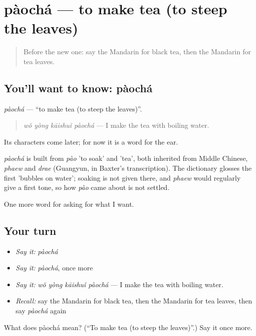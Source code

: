 \section[pàochá]{pàochá — to make tea (to steep the leaves)}

\label{lesson:ZH-C166-paocha}



\begin{quote}
Before the new one: say the Mandarin for black tea, then the Mandarin for tea leaves.
\end{quote}

\subsection*{You'll want to know: pàochá}
\emph{pàochá} — \textquotedblleft{}to make tea (to steep the leaves)\textquotedblright{}.

\begin{quote}
\emph{wǒ yòng kāishuǐ pàochá} — I make the tea with boiling water.
\end{quote}

Its characters come later; for now it is a word for the ear.

\begin{cousinweb}
\emph{pàochá} is built from \emph{pào} 'to soak' and  'tea', both inherited from Middle Chinese, \emph{phaew} and \emph{drae} (Guangyun, in Baxter's transcription). The dictionary glosses the first 'bubbles on water'; soaking is not given there, and \emph{phaew} would regularly give a first tone, so how \emph{pào} came about is not settled.
\end{cousinweb}

\begin{grammarlens}[title={What you've built}]
One more word for asking for what I want.
\end{grammarlens}

\subsection*{Your turn}
\begin{itemize}
\raggedright
  \item \emph{Say it:} \emph{pàochá}
  \item \emph{Say it:} \emph{pàochá}, once more
  \item \emph{Say it:} \emph{wǒ yòng kāishuǐ pàochá} — I make the tea with boiling water.
  \item \emph{Recall:} say the Mandarin for black tea, then the Mandarin for tea leaves, then say \emph{pàochá} again
\end{itemize}

\begin{tcolorbox}[breakable,colback=teal!4,colframe=teal!35!black,title={Before you move on}]
What does pàochá mean? (\textquotedblleft{}To make tea (to steep the leaves)\textquotedblright{}.) Say it once more.
\end{tcolorbox}
